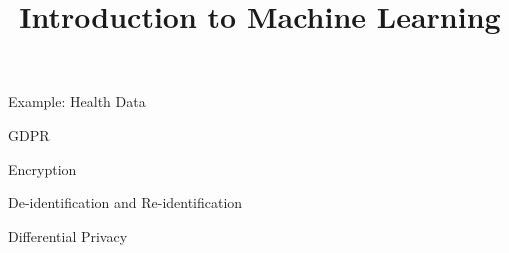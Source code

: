 


\newcommand{\learninggoals}{
\item XXXX
}


\title{Introduction to Machine Learning}
\date{}




\begin{vbframe}{Example: Health Data}


\end{vbframe}
\begin{vbframe}{GDPR}


\end{vbframe}
\begin{vbframe}{Encryption}


\end{vbframe}
\begin{vbframe}{De-identification and Re-identification}


\framebreak


\end{vbframe}
\begin{vbframe}{Differential Privacy}


\framebreak




\end{vbframe}
\endlecture

